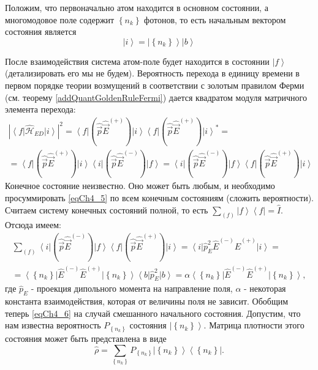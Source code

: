 Положим, что первоначально атом находится в основном состоянии, а
многомодовое поле содержит $\left\{n_k\right\}$ фотонов, то есть начальным
вектором состояния является 
\begin{equation}
\left|i\right> = \left|\left\{n_k\right\}\right> \left|b\right>
\label{eqCh4_4}
\end{equation}

После взаимодействия система атом-поле будет находится в состоянии
$\left|f\right>$ (детализировать его мы не будем). Вероятность
перехода в единицу времени в первом порядке теории возмущений в
соответствии с золотым правилом Ферми
(см. теорему \ref{addQuantGoldenRuleFermi}) дается 
квадратом модуля матричного элемента перехода: 
\begin{eqnarray}
\left|\left<f\right|\hat{\mathcal{H}}_{ED}\left|i\right>\right|^2 =
\left<f\right|\left(\hat{\vec{p}}\hat{\vec{E}}^{(+)}\right)\left|i\right>
\left<f\right|\left(\hat{\vec{p}}\hat{\vec{E}}^{(+)}\right)\left|i\right>^{*}
= 
\nonumber \\
=
\left<f\right|\left(\hat{\vec{p}}\hat{\vec{E}}^{(+)}\right)\left|i\right>
\left<i\right|\left(\hat{\vec{p}}\hat{\vec{E}}^{(-)}\right)\left|f\right>
=
\left<i\right|\left(\hat{\vec{p}}\hat{\vec{E}}^{(-)}\right)\left|f\right>
\left<f\right|\left(\hat{\vec{p}}\hat{\vec{E}}^{(+)}\right)\left|i\right>
\label{eqCh4_5}
\end{eqnarray}
Конечное состояние неизвестно. Оно может быть любым, и необходимо
просуммировать \eqref{eqCh4_5} по всем конечным состояниям (сложить
вероятности). Считаем систему конечных состояний полной, то есть  
$\sum_{(f)} \left|f\right>\left<f\right| = \hat{I}$.
Отсюда имеем: 
\begin{eqnarray}
\sum_{(f)}
\left<i\right|\left(\hat{\vec{p}}\hat{\vec{E}}^{(-)}\right)\left|f\right>
\left<f\right|\left(\hat{\vec{p}}\hat{\vec{E}}^{(+)}\right)\left|i\right>
= 
\left<i\right|\hat{p}_E^2\hat{E}^{(-)}\hat{E}^{(+)}\left|i\right> = 
\nonumber \\
=
\left<\left\{n_k\right\}\right|\hat{E}^{(-)}\hat{E}^{(+)}\left|\left\{n_k\right\}\right>\left<b\right|\hat{p}_E^2\left|b\right>
= 
\alpha \left<\left\{n_k\right\}\right|\hat{E}^{(-)}\hat{E}^{(+)}\left|\left\{n_k\right\}\right>,
\label{eqCh4_6}
\end{eqnarray}
где $\hat{p}_E$ -  проекция дипольного момента на направление поля,
$\alpha$ - некоторая константа взаимодействия, которая от величины
поля не зависит. Обобщим теперь \eqref{eqCh4_6} на случай смешанного
начального состояния. Допустим, что нам известна вероятность
$P_{\left\{n_k\right\}}$ состояния  $\left|\left\{n_k\right\}\right>$.
Матрица плотности этого состояния может быть представлена в виде 
\begin{equation}
\hat{\rho} = \sum_{\left\{n_k\right\}}P_{\left\{n_k\right\}}
\left|\left\{n_k\right\}\right>\left<\left\{n_k\right\}\right|.
\label{eqCh4_7}
\end{equation}

